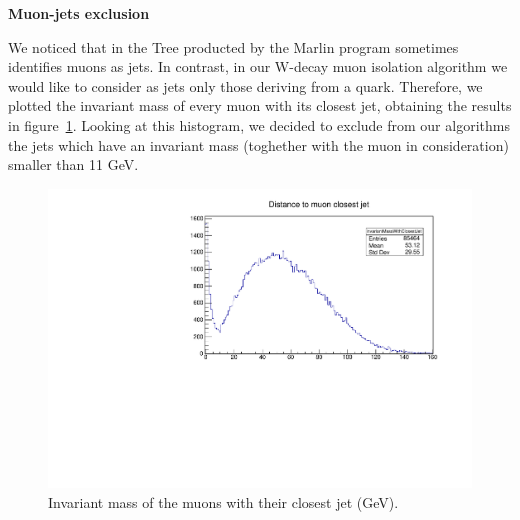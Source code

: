\textbf{Muon-jets exclusion}

We noticed that in the Tree producted by the Marlin program sometimes identifies muons as jets. In contrast, in our W-decay muon isolation algorithm we would like to consider as jets only those deriving from a quark. Therefore, we plotted the invariant mass of every muon with its closest jet, obtaining the results in figure~\ref{04_muonJetInvariantMass}. Looking at this histogram, we decided to exclude from our algorithms the jets which have an invariant mass (toghether with the muon in consideration) smaller than 11 GeV.

\begin{figure} [htp]
\centering
\includegraphics[scale=0.7]{04_muonJetInvariantMass.pdf}
\caption{Invariant mass of the muons with their closest jet (GeV).}
\label{04_muonJetInvariantMass}
\end{figure}
